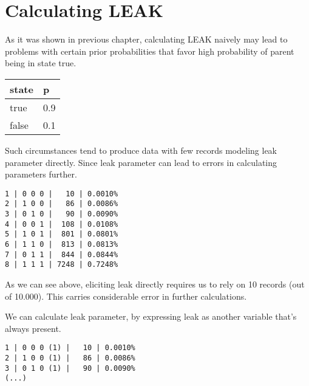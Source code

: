 \documentclass{article}
\begin{document}

\setlength\parindent{0pt} %

\renewcommand{\labelenumi}{\alph{enumi}.} %


\section{Calculating LEAK}

As it was shown in previous chapter, calculating LEAK naively may lead to problems with certain prior probabilities that favor high probability of parent being in state true.
\begin{longtable}{|l||p{2cm}|}
	\hline
	state & p \\\hline\hline
	true & 0.9 \\\hline
	false & 0.1 \\\hline
\end{longtable}

Such circumstances tend to produce data with few records modeling leak parameter directly.
Since leak parameter can lead to errors in calculating parameters further.

\begin{verbatim}
1 | 0 0 0 |   10 | 0.0010%
2 | 1 0 0 |   86 | 0.0086%
3 | 0 1 0 |   90 | 0.0090%
4 | 0 0 1 |  108 | 0.0108%
5 | 1 0 1 |  801 | 0.0801%
6 | 1 1 0 |  813 | 0.0813%
7 | 0 1 1 |  844 | 0.0844%
8 | 1 1 1 | 7248 | 0.7248%
\end{verbatim}

As we can see above, eliciting leak directly requires us to rely on 10 records (out of 10.000).
This carries considerable error in further calculations.

We can calculate leak parameter, by expressing leak as another variable that's always present.

\begin{verbatim}
1 | 0 0 0 (1) |   10 | 0.0010%
2 | 1 0 0 (1) |   86 | 0.0086%
3 | 0 1 0 (1) |   90 | 0.0090%
(...)
\end{verbatim}
\end{document}
